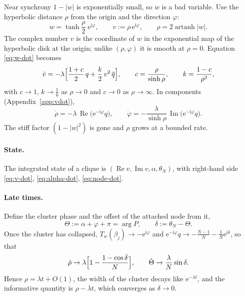 \documentclass[a4paper,11pt]{article}
\newcommand{\conj}[1]{\overline{#1}}
\newcommand{\T}{T}                       %
\newcommand{\im}{\operatorname{Im}}
\newcommand{\re}{\operatorname{Re}}
\newcommand{\e}{\mathrm{e}}
\newcommand{\ii}{\mathrm{i}}
\theoremstyle{remark}
\begin{document}
Near synchrony $1-|w|$ is exponentially small, so $w$ is a bad variable. Use
the hyperbolic distance $\rho$ from the origin and the direction $\varphi$:
\begin{equation}\label{eq:v-def}
w=\tanh\!\frac\rho2\;\e^{\ii\varphi},\qquad v:=\rho\,\e^{\ii\varphi},\qquad
\rho=2\operatorname{artanh}|w| .
\end{equation}
The complex number $v$ is the coordinate of $w$ in the exponential map of the
hyperbolic disk at the origin; unlike $(\rho,\varphi)$ it is smooth at
$\rho=0$. Equation \eqref{eq:w-dot} becomes
\begin{equation}\label{eq:v-dot}
\dot v=-\lambda\Bigl[\frac{1+c}{2}\,q+\frac{k}{2}\,v^2\,\conj q\Bigr],\qquad
c=\frac{\rho}{\sinh\rho},\qquad k=\frac{1-c}{\rho^2},
\end{equation}
with $c\to1$, $k\to\frac16$ as $\rho\to0$ and $c\to0$ as $\rho\to\infty$. In
components (Appendix~\ref{app:vdot}),
\begin{equation}\label{eq:rho-dot}
\dot\rho=-\lambda\,\re\bigl(\e^{-\ii\varphi}q\bigr),\qquad
\dot\varphi=-\frac{\lambda}{\sinh\rho}\,\im\bigl(\e^{-\ii\varphi}q\bigr).
\end{equation}
The stiff factor $(1-|w|^2)$ is gone and $\rho$ grows at a bounded rate.

\paragraph{State.} The integrated state of a clique is
$(\re v,\im v,\alpha,\theta_N)$, with right-hand side
\eqref{eq:v-dot}, \eqref{eq:alpha-dot}, \eqref{eq:node-dot}.

\paragraph{Late times.} Define the cluster phase and the offset of the attached
node from it,
\begin{equation}\label{eq:cluster-phase}
\Theta:=\alpha+\varphi+\pi=\arg P,\qquad \delta:=\theta_N-\Theta .
\end{equation}
Once the cluster has collapsed, $\T_w(\beta_j)\to-\e^{\ii\varphi}$ and
$\e^{-\ii\varphi}q\to-\frac{N-1}{N}-\frac1N\e^{\ii\delta}$, so that
\begin{equation}\label{eq:rho-late}
\dot\rho\to\lambda\Bigl[1-\frac{1-\cos\delta}{N}\Bigr],\qquad
\dot\Theta\to\frac{\lambda}{N}\sin\delta .
\end{equation}
Hence $\rho=\lambda t+O(1)$, the width of the cluster decays like
$\e^{-\lambda t}$, and the informative quantity is $\rho-\lambda t$, which
converges as $\delta\to0$.
\end{document}
